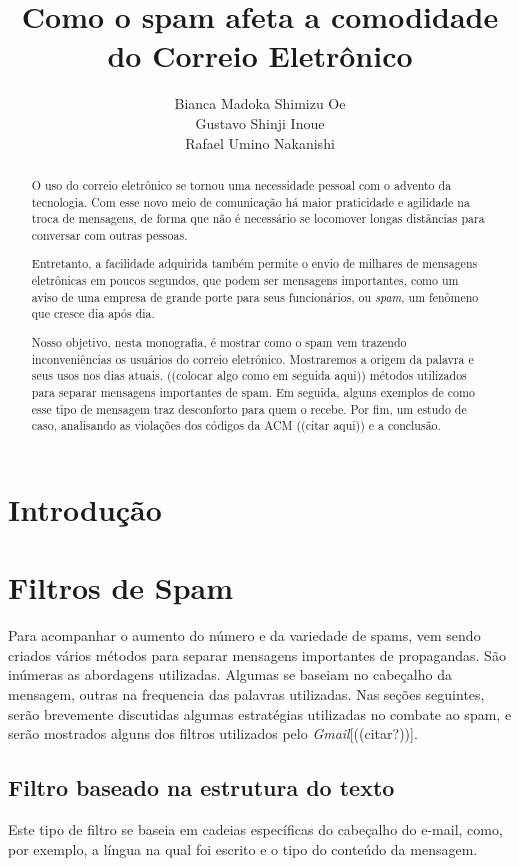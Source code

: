 \documentclass{article}
\title{Como o spam afeta a comodidade do Correio Eletrônico}
\author{Bianca Madoka Shimizu Oe\\
		Gustavo Shinji Inoue\\
		Rafael Umino Nakanishi}
\begin{document}
\maketitle
\newpage

\begin{abstract}
	O uso do correio eletrônico se tornou uma necessidade pessoal com o advento da tecnologia. Com esse novo meio de comunicação há maior praticidade e agilidade na troca de mensagens, de forma que não é necessário se locomover longas distâncias para conversar com outras pessoas.

	Entretanto, a facilidade adquirida também permite o envio de milhares de mensagens eletrônicas em poucos segundos, que podem ser mensagens importantes, como um aviso de uma empresa de grande porte para seus funcionários, ou \emph{spam}, um fenômeno que cresce dia após dia.

	Nosso objetivo, nesta monografia, é mostrar como o spam vem trazendo inconveniências os usuários do correio eletrônico.
	Mostraremos a origem da palavra e seus usos nos dias atuais. 
	((colocar algo como em seguida aqui)) métodos utilizados para separar mensagens importantes de spam.
	Em seguida, alguns exemplos de como esse tipo de mensagem traz desconforto para quem o recebe. 
	Por fim, um estudo de caso, analisando as violações dos códigos da ACM ((citar aqui)) e a conclusão.
\end{abstract}

\newpage

\tableofcontents
\newpage

\section{Introdução}
	
\section{Filtros de Spam}
	Para acompanhar o aumento do número e da variedade de spams, vem sendo criados vários métodos para separar mensagens importantes de propagandas.
	São inúmeras as abordagens utilizadas. 
	Algumas se baseiam no cabeçalho da mensagem, outras na frequencia das palavras utilizadas.
	Nas seções seguintes, serão brevemente discutidas algumas estratégias utilizadas no combate ao spam, e serão mostrados alguns dos filtros utilizados pelo \emph{Gmail}[((citar?))].

	\subsection{Filtro baseado na estrutura do texto}
		Este tipo de filtro se baseia em cadeias específicas do cabeçalho do e-mail, como, por exemplo, a língua na qual foi escrito e o tipo do conteúdo da mensagem.
\end{document}
